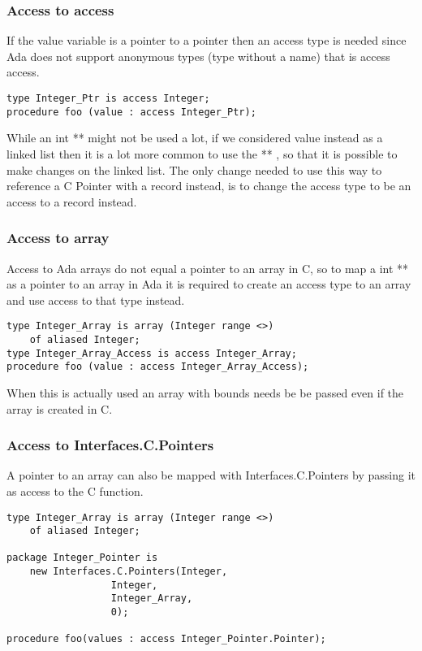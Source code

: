 \subsubsection{Access to access}
If the value variable is a pointer to a pointer then an access type is needed since Ada does not support anonymous types (type without a name) that is access access.
\begin{lstlisting}
type Integer_Ptr is access Integer;
procedure foo (value : access Integer_Ptr);
\end{lstlisting}
While an int ** might not be used a lot, if we considered value instead as a linked list then it is a lot more common to use the ** , so that it is possible to make changes on the linked list. The only change needed to use this way to reference a C Pointer with a record instead,  is to change the access type to be an access to a record instead.
\subsubsection{Access to array}
Access to Ada arrays do not equal a pointer to an array in C, so to  map a int ** as a pointer to an array in Ada it is required to create an access type to an array and use access to that type instead.
\begin{lstlisting}
type Integer_Array is array (Integer range <>) 
	of aliased Integer;
type Integer_Array_Access is access Integer_Array;
procedure foo (value : access Integer_Array_Access);
\end{lstlisting}
When this is actually used an array with bounds needs be be passed even if the array is created in C.
\subsubsection{Access to Interfaces.C.Pointers}
A pointer to an array can also be mapped with Interfaces.C.Pointers by passing it as access to the C function.
\begin{lstlisting}
type Integer_Array is array (Integer range <>) 
	of aliased Integer;

package Integer_Pointer is 
	new Interfaces.C.Pointers(Integer, 
				  Integer, 
				  Integer_Array, 
				  0);

procedure foo(values : access Integer_Pointer.Pointer);
\end{lstlisting}

